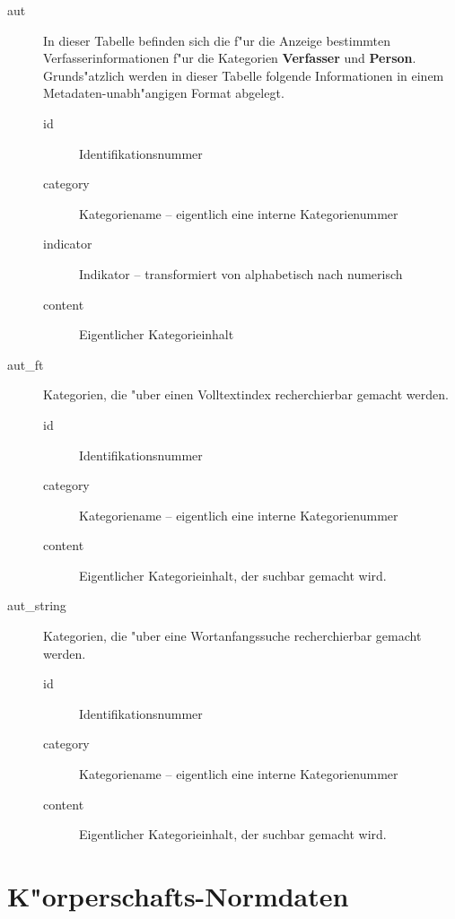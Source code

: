 \documentclass[11pt, twoside, a4paper, BCOR8mm, DIV12, bibtotoc,idxtotoc]{scrbook}
\begin{document}
\begin{description}
\item[aut] In dieser Tabelle befinden sich die f"ur die Anzeige
  bestimmten Verfasserinformationen f"ur die Kategorien
  \textbf{Verfasser} und \textbf{Person}. Grunds"atzlich werden in
  dieser Tabelle folgende Informationen in einem
  Metadaten-unabh"angigen Format abgelegt.
  \begin{description}
  \item[id] Identifikationsnummer
  \item[category] Kategoriename -- eigentlich eine interne Kategorienummer
  \item[indicator] Indikator -- transformiert von alphabetisch nach numerisch
  \item[content] Eigentlicher Kategorieinhalt
  \end{description}
\item[aut\_ft] Kategorien, die "uber einen Volltextindex recherchierbar
  gemacht werden.
  \begin{description}
  \item[id] Identifikationsnummer
  \item[category] Kategoriename -- eigentlich eine interne Kategorienummer
  \item[content] Eigentlicher Kategorieinhalt, der suchbar gemacht wird.
  \end{description}
\item[aut\_string] Kategorien, die "uber eine Wortanfangssuche
  recherchierbar gemacht werden.
  \begin{description}
  \item[id] Identifikationsnummer
  \item[category] Kategoriename -- eigentlich eine interne Kategorienummer
  \item[content] Eigentlicher Kategorieinhalt, der suchbar gemacht wird.
  \end{description}
\end{description}

\section{K"orperschafts-Normdaten}
\end{document}
